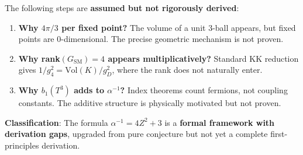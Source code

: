 \documentclass[12pt,a4paper]{article}
\newcommand{\Zsq}{Z^2}
\begin{document}
\begin{tcolorbox}[colback=yellow!10!white, colframe=orange!75!black, title=Open Derivation Gaps (Honest Assessment)]
The following steps are \textbf{assumed but not rigorously derived}:
\begin{enumerate}[itemsep=0pt]
    \item \textbf{Why $4\pi/3$ per fixed point?} The volume of a unit 3-ball appears, but fixed points are 0-dimensional. The precise geometric mechanism is not proven.
    \item \textbf{Why rank$(G_{\text{SM}}) = 4$ appears multiplicatively?} Standard KK reduction gives $1/g_4^2 = \text{Vol}(K)/g_D^2$, where the rank does not naturally enter.
    \item \textbf{Why $b_1(T^3)$ adds to $\alpha^{-1}$?} Index theorems count fermions, not coupling constants. The additive structure is physically motivated but not proven.
\end{enumerate}

\textbf{Classification}: The formula $\alpha^{-1} = 4\Zsq + 3$ is a \textbf{formal framework with derivation gaps}, upgraded from pure conjecture but not yet a complete first-principles derivation.
\end{tcolorbox}
\end{document}
